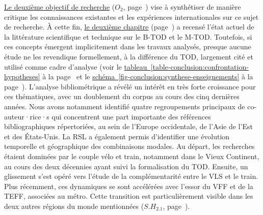 \begin{refsegment}
\hyperref[objectif-2]{Le deuxième objectif de recherche} (\(O_2\), page~\pageref{objectif-2}) vise à synthétiser de manière critique les connaissances existantes et les expériences internationales sur ce sujet de recherche. À cette fin, \hyperref[chap2:titre]{le deuxième chapitre} (page~\pageref{chap2:titre}) a recensé l'état actuel de la littérature scientifique et technique sur le \acrshort{B-TOD} et le \acrshort{M-TOD}. Toutefois, si ces concepts émergent implicitement dans les travaux analysés, presque aucune étude ne les revendique formellement, à la différence du \acrshort{TOD}, largement cité et utilisé comme cadre d'analyse (voir le \hyperref[table-conclusion:confrontation-hypotheses]{tableau~\ref{table-conclusion:confrontation-hypotheses}} à la page~\pageref{table-conclusion:confrontation-hypotheses} et le \hyperref[fig-conclusion:synthese-enseignements]{schéma~\ref{fig-conclusion:synthese-enseignements}} à la page~\pageref{fig-conclusion:synthese-enseignements}). L’analyse bibliométrique a révélé un intérêt en très forte croissance pour ces thématiques, avec un doublement du corpus au cours des cinq dernières années. Nous avons notamment identifié quatre regroupements principaux de co-auteur·rice·s qui concentrent une part importante des références bibliographiques répertoriées, au sein de l'Europe occidentale, de l'Asie de l'Est et des États-Unis. La \acrfull{RSL} a également permis d’identifier une évolution temporelle et géographique des combinaisons modales. Au départ, les recherches étaient dominées par le couple vélo et train, notamment dans le Vieux Continent, au cours des deux décennies ayant suivi la formalisation du \acrshort{TOD}. Ensuite, un glissement s’est opéré vers l'étude de la complémentarité entre le \acrfull{VLS} et le train. Plus récemment, ces dynamiques se sont accélérées avec l’essor du \acrfull{VFF} et de la \acrfull{TEFF}, associées au métro. Cette transition est particulièrement visible dans les deux autres régions du monde mentionnées (\hyperref[sous-hypothese-2.1]{\(S.H_{2.1}\)}, page~\pageref{sous-hypothese-2.1}).%


\end{refsegment}
